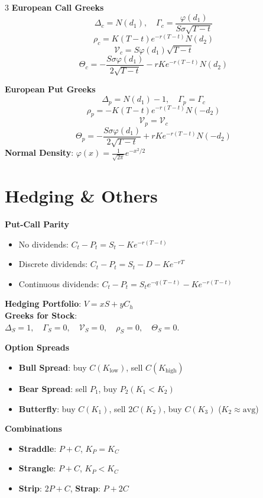 \documentclass[8pt, a4paper, landscape]{extarticle}
\begin{document}
\begin{multicols*}{3}
\textbf{European Call Greeks}
\[ \Delta_c = N(d_1), \quad \Gamma_c = \frac{\varphi(d_1)}{S\sigma\sqrt{T-t}} \]
\[ \rho_c = K(T-t)e^{-r(T-t)}N(d_2) \]
\[ \mathcal{V}_c = S \varphi(d_1) \sqrt{T-t} \]
\[ \Theta_c = -\frac{S\sigma\varphi(d_1)}{2\sqrt{T-t}} - rKe^{-r(T-t)}N(d_2) \]

\textbf{European Put Greeks}
\[ \Delta_p = N(d_1) - 1, \quad \Gamma_p = \Gamma_c \]
\[ \rho_p = -K(T-t)e^{-r(T-t)}N(-d_2) \]
\[ \mathcal{V}_p = \mathcal{V}_c \]
\[ \Theta_p = -\frac{S\sigma\varphi(d_1)}{2\sqrt{T-t}} + rKe^{-r(T-t)}N(-d_2) \]
\textbf{Normal Density}: $\varphi(x) = \frac{1}{\sqrt{2\pi}} e^{-x^2/2}$

\section*{Hedging \& Others}
\textbf{Put-Call Parity} \\
\begin{itemize}
    \item No dividends: $C_t - P_t = S_t - K e^{-r(T-t)}$ \\
    \item Discrete dividends: $C_t - P_t = S_t - D - K e^{-rT}$ \\
    \item Continuous dividends: $C_t - P_t = S_t e^{-q(T-t)} - K e^{-r(T-t)}$
\end{itemize}

\textbf{Hedging Portfolio}: $V = x S + y C_h$ \\
\textbf{Greeks for Stock}: \\
$\Delta_S = 1, \quad \Gamma_S = 0, \quad \mathcal{V}_S = 0, \quad \rho_S = 0, \quad \Theta_S = 0$.

\textbf{Option Spreads}
\begin{itemize}
    \item \textbf{Bull Spread}: buy $C(K_{\text{low}})$, sell $C(K_{\text{high}})$
    \item \textbf{Bear Spread}: sell $P_1$, buy $P_2 (K_1 < K_2)$
    \item \textbf{Butterfly}: buy $C(K_1)$, sell $2C(K_2)$, buy $C(K_3)$ ($K_2 \approx \text{avg}$)
\end{itemize}
\textbf{Combinations}
\begin{itemize}
    \item \textbf{Straddle}: $P+C$, $K_P = K_C$
    \item \textbf{Strangle}: $P+C$, $K_P < K_C$
    \item \textbf{Strip}: $2P+C$, \textbf{Strap}: $P+2C$
\end{itemize}


\end{multicols*}
\end{document}
